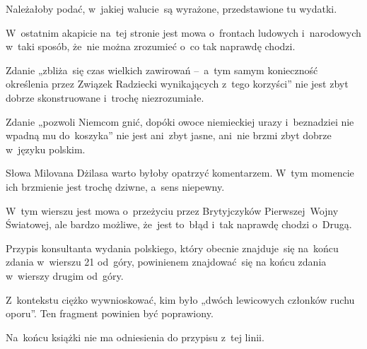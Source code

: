 \documentclass[a4paper,11pt]{article}
\begin{document}
\vspace{\spaceFour}


\start {} Należałoby podać, w~jakiej walucie~są wyrażone,
przedstawione tu wydatki.

\vspace{\spaceFour}


\start {} W~ostatnim akapicie na~tej stronie jest mowa
o~frontach ludowych i~narodowych w~taki sposób, że~nie można zrozumieć
o~co tak naprawdę chodzi.

\vspace{\spaceFour}


\start {} Zdanie „zbliża~się czas wielkich zawirowań
--~a~tym samym konieczność określenia przez Związek Radziecki
wynikających z~tego korzyści” nie jest zbyt dobrze skonstruowane
i~trochę niezrozumiałe.

\vspace{\spaceFour}


\start {} Zdanie „pozwoli Niemcom gnić, dopóki owoce
niemieckiej urazy i~beznadziei nie wpadną mu do~koszyka” nie jest
ani~zbyt jasne, ani~nie brzmi zbyt dobrze w~języku polskim.

\vspace{\spaceFour}


\start {} Słowa Milovana Dżilasa warto byłoby opatrzyć
komentarzem. W~tym momencie ich brzmienie jest trochę dziwne, a~sens
niepewny.

\vspace{\spaceFour}


\start {} W~tym wierszu jest mowa o~przeżyciu przez
Brytyjczyków Pierwszej~Wojny Światowej, ale bardzo możliwe, że~jest
to~błąd i~tak naprawdę chodzi o~Drugą.

\vspace{\spaceFour}


\start {} Przypis konsultanta wydania polskiego, który obecnie
znajduje~się na~końcu zdania w~wierszu 21 od~góry, powinienem
znajdować~się na końcu zdania w~wierszy drugim od~góry.

\vspace{\spaceFour}


\start {} Z~kontekstu ciężko wywnioskować, kim było
„dwóch lewicowych członków ruchu oporu”. Ten fragment powinien być
poprawiony.

\vspace{\spaceFour}


\start {} Na~końcu książki nie ma odniesienia do przypisu
z~tej linii.
\end{document}
